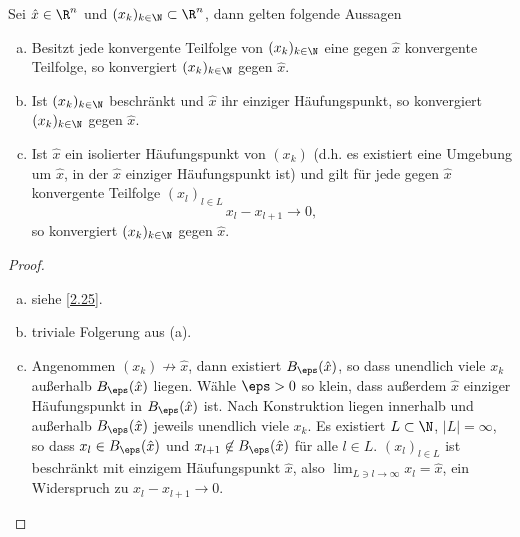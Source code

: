 \begin{lem} \label{2.58}
	Sei $\hat x \in \R^n$ und $(x_k)_{k\in\N} \subset \R^n$, dann gelten folgende Aussagen
	\begin{enumerate}[(a)]
		\item
			Besitzt jede konvergente Teilfolge von $(x_k)_{k\in\N}$ eine gegen $\hat x$ konvergente Teilfolge, so konvergiert $(x_k)_{k\in\N}$ gegen $\hat x$.
		\item
			Ist $(x_k)_{k\in\N}$ beschränkt und $\hat x$ ihr einziger Häufungspunkt, so konvergiert $(x_k)_{k\in\N}$ gegen $\hat x$.
		\item
			Ist $\hat x$ ein isolierter Häufungspunkt von $(x_k)$ (d.h. es existiert eine Umgebung um $\hat x$, in der $\hat x$ einziger Häufungspunkt ist) und gilt für jede gegen $\hat x$ konvergente Teilfolge $(x_l)_{l\in L}$
			\[
				x_l - x_{l+1} \to 0,
			\]
			so konvergiert $(x_k)_{k\in\N}$ gegen $\hat x$.
	\end{enumerate}
	\begin{proof}
		\begin{enumerate}[(a)]
			\item
				siehe \ref{2.25}.
			\item
				triviale Folgerung aus (a).
			\item
{}
				Angenommen $(x_k) \not\to \hat x$, dann existiert $B_\eps(\hat x)$, so dass unendlich viele $x_k$ außerhalb $B_\eps (\hat x)$ liegen.
				Wähle $\eps > 0$ so klein, dass außerdem $\hat x$ einziger Häufungspunkt in $B_\eps(\hat x)$ ist.
				Nach Konstruktion liegen innerhalb und außerhalb $B_\eps(\hat x)$ jeweils unendlich viele $x_k$.
				Es existiert $L \subset \N$, $|L| = \infty$, so dass $x_l \in B_\eps(\hat x)$ und $x_{l+1} \not\in B_\eps(\hat x)$ für alle $l \in L$.
				$(x_l)_{l\in L}$ ist beschränkt mit einzigem Häufungspunkt $\hat x$, also $\lim_{L\ni l\to \infty} x_l = \hat x$, ein Widerspruch zu $x_l - x_{l+1} \to 0$.
		\end{enumerate}
	\end{proof}
\end{lem}

